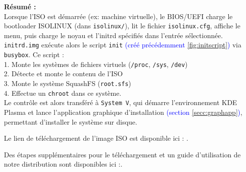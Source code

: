 \medskip
\textbf{Résumé :}\\
Lorsque l'ISO est démarrée (ex: machine virtuelle), le BIOS/UEFI charge le bootloader ISOLINUX (dans \texttt{isolinux/}), lit le fichier \texttt{isolinux.cfg}, affiche le menu, puis charge le noyau et l'initrd spécifiés dans l'entrée sélectionnée.\\

\texttt{initrd.img} exécute alors le script \texttt{init} \textcolor{blue}{(créé précédemment \ref{fig:initscript})} via \texttt{busybox}. Ce script :\\
1. Monte les systèmes de fichiers virtuels (\texttt{/proc}, \texttt{/sys}, \texttt{/dev})\\
2. Détecte et monte le contenu de l'ISO\\
3. Monte le système SquashFS (\texttt{root.sfs})\\
4. Effectue un \texttt{chroot} dans ce système.\\

Le contrôle est alors transféré à \texttt{System V}, qui démarre l'environnement KDE Plasma et lance l'application graphique d'installation \textcolor{blue}{(section \ref{secc:graphapp})}, permettant d'installer le système sur disque.

\bigbreak
Le lien de téléchargement de l’image ISO est disponible ici : \cite{iso_link}.

Des étapes supplémentaires pour le téléchargement et un guide d’utilisation de notre distribution  sont  disponibles ici :\cite{guide_iso}.

